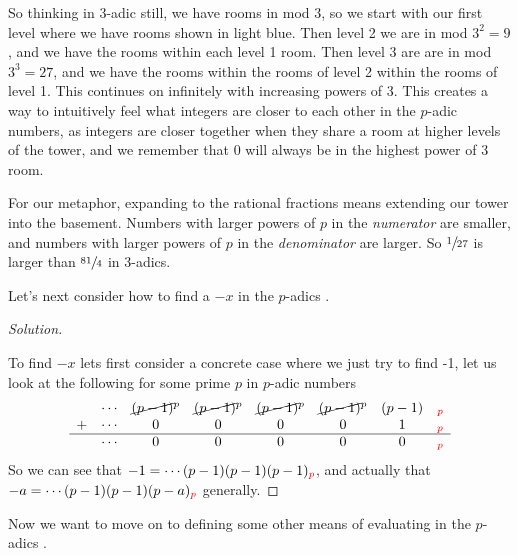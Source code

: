 \documentclass[11pt]{article}
\newcommand*\inb[1]{_{\textcolor{red}{#1}}}
\newcommand{\padic}{$p$-adic }
\newcommand{\padics}{$p$-adics }
\newenvironment{solution}
  {\renewcommand\qedsymbol{$~$}\begin{proof}[Solution]$ $\par\nobreak\ignorespaces}
  {\end{proof}}
\begin{document}
So thinking in 3-adic still, we have rooms in mod 3, so we start with our first level where we have rooms shown in light blue. Then level 2 we are in mod $3^2=9$, and we have the rooms within each level 1 room. Then level 3 are are in mod $3^3=27$, and we have the rooms within the rooms of level 2 within the rooms of level 1. This continues on infinitely with increasing powers of 3. This creates a way to intuitively feel what integers are closer to each other in the \padic numbers, as integers are closer together when they share a room at higher levels of the tower, and we remember that 0 will always be in the highest power of 3 room.

For our metaphor, expanding to the rational fractions means extending our tower into the basement. Numbers with larger powers of $p$ in the \textit{numerator} are smaller, and numbers with larger powers of $p$ in the \textit{denominator} are larger. So $\sfrac{1}{27}$ is larger than $\sfrac{81}{4}$ in 3-adics.





Let's next consider how to find a $-x$ in the \padics.
\begin{solution}
  To find $-x$ lets first consider a concrete case where we just try to find -1, let us look at the following for some prime $p$ in \padic numbers
  \[
    \begin{matrix}
      ~ & \cdots & \cancel{(p-1)}^{p} & \cancel{(p-1)}^{p} & \cancel{(p-1)}^{p} & \cancel{(p-1)}^{p} & (p-1) & \inb{p} \\
      + & \cdots & 0                  & 0                  & 0                  & 0                  & 1     & \inb{p} \\
      \hline
      ~ & \cdots & 0                  & 0                  & 0                  & 0                  & 0     & \inb{p} \\
    \end{matrix}
  \]
  So we can see that $-1=\cdots(p-1)(p-1)(p-1)\inb{p}$, and actually that $-a=\cdots(p-1)(p-1)(p-a)\inb{p}$ generally.
\end{solution}





Now we want to move on to defining some other means of evaluating in the \padics.
\end{document}
